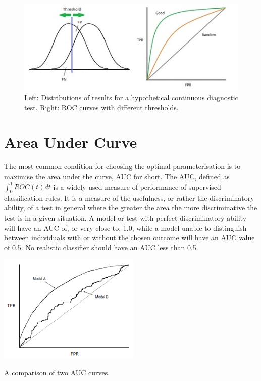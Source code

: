 \begin{figure}
	\includegraphics{roc_curves/Figure2.png}
	\caption{Left: Distributions of results for a hypothetical continuous diagnostic test. Right: ROC curves with different thresholds.}
	\label{fig:roc-curves}
\end{figure}

\section{Area Under Curve} 
The most common condition for choosing the optimal parameterisation is to maximise the area under the curve, AUC for short. The AUC, defined as $\int_{0}^{1} ROC(t) dt$ is a widely used measure of performance of supervised classification rules. It is a measure of the usefulness, or rather the discriminatory ability, of a test in general where the greater the area the more discriminative the test is in a given situation. A model or test with perfect discriminatory ability will have an AUC of, or very close to, 1.0, while a model unable to distinguish between individuals with or without the chosen outcome will have an AUC value of 0.5.  No realistic classifier should have an AUC less than 0.5. 

\begin{marginfigure}
	\includegraphics{roc_curves/Figure3.png}
	\caption{A comparison of two AUC curves.}
	\label{fig:two-curves}
\end{marginfigure}

